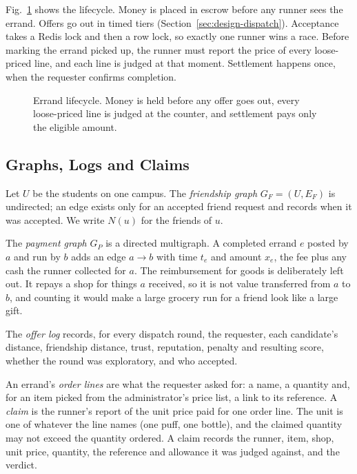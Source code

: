 \documentclass[journal]{IEEEtran}
\begin{document}
Fig.~\ref{fig:lifecycle} shows the lifecycle. Money is placed in escrow before any
runner sees the errand. Offers go out in timed tiers (Section~\ref{sec:design-dispatch}).
Acceptance takes a Redis lock and then a row lock, so exactly one runner wins a
race. Before marking the errand picked up, the runner must report the price of
every loose-priced line, and each line is judged at that moment. Settlement happens
once, when the requester confirms completion.

\begin{figure}[!t]
\centering

\caption{Errand lifecycle. Money is held before any offer goes out, every
loose-priced line is judged at the counter, and settlement pays only the eligible
amount.}
\label{fig:lifecycle}
\end{figure}

\subsection{Graphs, Logs and Claims}\label{sec:defs}
Let $U$ be the students on one campus. The \emph{friendship graph}
$G_F=(U,E_F)$ is undirected; an edge exists only for an accepted friend request and
records when it was accepted. We write $N(u)$ for the friends of $u$.

The \emph{payment graph} $G_P$ is a directed multigraph. A completed errand $e$
posted by $a$ and run by $b$ adds an edge $a\to b$ with time $t_e$ and amount
$x_e$, the fee plus any cash the runner collected for $a$. The reimbursement for
goods is deliberately left out. It repays a shop for things $a$ received, so it is
not value transferred from $a$ to $b$, and counting it would make a large grocery run
for a friend look like a large gift.

The \emph{offer log} records, for every dispatch round, the requester, each
candidate's distance, friendship distance, trust, reputation, penalty and resulting
score, whether the round was exploratory, and who accepted.

An errand's \emph{order lines} are what the requester asked for: a name, a quantity
and, for an item picked from the administrator's price list, a link to its
reference. A \emph{claim} is the runner's report of the unit price paid for one order
line. The unit is one of whatever the line names (one puff, one bottle), and the
claimed quantity may not exceed the quantity ordered. A claim records the runner,
item, shop, unit price, quantity, the reference and allowance it was judged against,
and the verdict.
\end{document}
